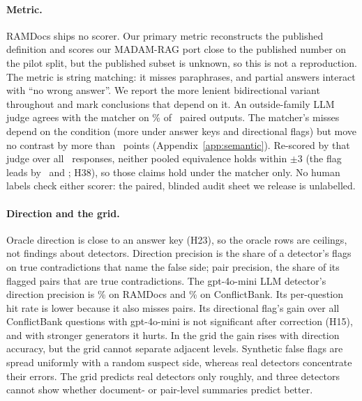 \paragraph{Metric.} RAMDocs ships no scorer. Our primary metric reconstructs the published definition and scores our
MADAM-RAG port close to the published number on the pilot split, but the published subset is unknown, so this
is not a reproduction. The metric is string matching: it misses paraphrases, and partial answers interact with ``no wrong
answer''. We report the more lenient bidirectional variant throughout and mark conclusions that depend on
it. An outside-family LLM judge agrees with the matcher on \semAgree\% of \semN\ paired outputs. The matcher's
misses depend on the condition (more under answer keys and directional flags) but move no contrast by more than
\semDidMax\ points (Appendix~\ref{app:semantic}). Re-scored by that judge over all \jdN\ responses, neither pooled equivalence holds within
$\pm$3 (the flag leads by \jdThirtyJ\ and \jdTwentyThreeJ; H38), so those claims hold under the matcher only.
No human labels check either scorer: the paired, blinded audit sheet we release is unlabelled.

\paragraph{Direction and the grid.} Oracle direction is close to an answer key (H23), so the
oracle rows are ceilings, not findings about detectors. Direction precision is the share of a detector's flags on true
contradictions that name the false side; pair precision, the share of its flagged pairs that are
true contradictions. The gpt-4o-mini LLM detector's direction precision is
\dirAccLlm\% on RAMDocs and \cbDirAccLlm\% on ConflictBank. Its per-question hit rate is lower because it also misses pairs. Its directional flag's gain over
all ConflictBank questions with gpt-4o-mini is not significant after correction (H15), and with stronger generators it
hurts. In the grid the gain rises with direction accuracy, but the grid cannot separate adjacent levels.
Synthetic false flags are spread uniformly with a random suspect side, whereas real detectors concentrate their
errors. The grid predicts real detectors only roughly, and three detectors cannot show whether document- or pair-level
summaries predict better.

